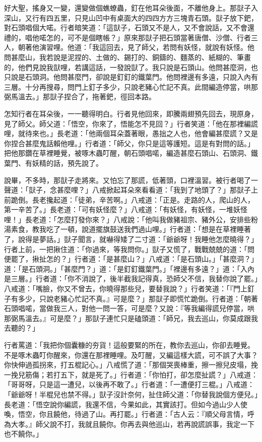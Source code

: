 好大聖，搖身又一變，還變做個蟭蟟蟲，釘在他耳朵後面，不離他身上。那獃子入深山，又行有四五里，只見山凹中有桌面大的四四方方三塊青石頭。獃子放下鈀，對石頭唱個大喏。行者暗笑道：「這獃子，石頭又不是人，又不會說話，又不會還禮的，唱他喏怎的，可不是個瞎帳？」原來那獃子把石頭當著唐僧、沙僧、行者三人，朝著他演習哩。他道：「我這回去，見了師父，若問有妖怪，就說有妖怪。他問甚麼山，我若說是泥捏的、土做的、錫打的、銅鑄的、麵蒸的、紙糊的、筆畫的，他們見說我獃哩，若講這話，一發說獃了。我只說是石頭山。他問甚麼洞，也只說是石頭洞。他問甚麼門，卻說是釘釘的鐵葉門。他問裡邊有多遠，只說入內有三層。十分再搜尋，問門上釘子多少，只說老豬心忙記不真。此間編造停當，哄那弼馬溫去。」那獃子捏合了，拖著鈀，徑回本路。

怎知行者在耳朵後，一一聽得明白。行者見他回來，即騰兩翅預先回去，現原身，見了師父。師父道：「悟空，你來了，悟能怎不見回？」行者笑道：「他在那裡編謊哩，就待來也。」長老道：「他兩個耳朵蓋著眼，愚拙之人也，他會編甚麼謊？又是你捏合甚麼鬼話賴他哩。」行者道：「師父，你只是這等護短。這是有對問的話。」把他那鑽在草裡睡覺，被啄木蟲叮醒，朝石頭唱喏，編造甚麼石頭山、石頭洞、鐵葉門、有妖精的話，預先說了。

說畢，不多時，那獃子走將來。又怕忘了那謊，低著頭，口裡溫習。被行者喝了一聲道：「獃子，念甚麼哩？」八戒掀起耳朵來看看道：「我到了地頭了？」那獃子上前跪倒。長老攙起道：「徒弟，辛苦啊。」八戒道：「正是。走路的人，爬山的人，第一辛苦了。」長老道：「可有妖怪麼？」八戒道：「有妖怪，有妖怪，一堆妖怪哩！」長老道：「怎麼打發你來？」八戒說：「他叫我做豬祖宗、豬外公，安排些粉湯素食，教我吃了一頓，說道擺旗鼓送我們過山哩。」行者道：「想是在草裡睡著了，說得是夢話。」獃子聞言，就嚇得矮了二寸道：「爺爺呀！我睡他怎麼曉得？」行者上前，一把揪住道：「你過來，等我問你。」獃子又慌了，戰戰兢兢的道：「問便罷了，揪扯怎的？」行者道：「是甚麼山？」八戒道：「是石頭山。」「甚麼洞？」道：「是石頭洞。」「甚麼門？」道：「是釘釘鐵葉門。」「裡邊有多遠？」道：「入內是三層。」行者道：「你不消說了，後半截我記得真，恐師父不信，我替你說了罷。」八戒道：「嘴臉，你又不曾去，你曉得那些兒，要替我說？」行者笑道：「『門上釘子有多少，只說老豬心忙記不真。』可是麼？」那獃子即慌忙跪倒。行者道：「朝著石頭唱喏，當做我三人，對他一問一答，可是麼？又說：『等我編得謊兒停當，哄那弼馬溫去。』可是麼？」那獃子連忙只是磕頭道：「師兄，我去巡山，你莫成跟我去聽的？」

行者罵道：「我把你個囊糠的夯貨！這般要緊的所在，教你去巡山，你卻去睡覺。不是啄木蟲叮你醒來，你還在那裡睡哩。及叮醒，又編這樣大謊，可不誤了大事？你快伸過孤拐來，打五棍記心。」八戒慌了道：「那個哭喪棒重，擦一擦兒皮塌，挽一挽兒筋傷；若打五下，就是死了。」行者道：「你怕打，卻怎麼扯謊？」八戒道：「哥哥呀，只是這一遭兒，以後再不敢了。」行者道：「一遭便打三棍。」八戒道：「爺爺呀！半棍兒也禁不得。」獃子沒計奈何，扯住師父道：「你替我說個方便兒。」長老道：「悟空說你編謊，我還不信，今果如此，其實該打。但如今過山少人使喚，悟空，你且饒他，待過了山。再打罷。」行者道：「古人云：『順父母言情，呼為大孝。』師父說不打，我就且饒你。你再去與他巡山，若再說謊誤事，我定一下也不饒你。」

